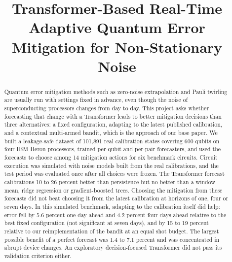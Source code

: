 \documentclass[conference]{IEEEtran}
\begin{document}
\title{Transformer-Based Real-Time Adaptive Quantum Error Mitigation for Non-Stationary Noise}

\author{
\and
{}
\and
{}
}

\maketitle

\begin{abstract}
Quantum error mitigation methods such as zero-noise extrapolation and Pauli twirling are usually run with settings fixed in advance, even though the noise of superconducting processors changes from day to day. This project asks whether forecasting that change with a Transformer leads to better mitigation decisions than three alternatives: a fixed configuration, adapting to the latest published calibration, and a contextual multi-armed bandit, which is the approach of our base paper. We built a leakage-safe dataset of 101,891 real calibration states covering 600 qubits on four IBM Heron processors, trained per-qubit and per-pair forecasters, and used the forecasts to choose among 14 mitigation actions for six benchmark circuits. Circuit execution was simulated with noise models built from the real calibrations, and the test period was evaluated once after all choices were frozen. The Transformer forecast calibrations 10 to 26 percent better than persistence but no better than a window mean, ridge regression or gradient-boosted trees. Choosing the mitigation from these forecasts did not beat choosing it from the latest calibration at horizons of one, four or seven days. In this simulated benchmark, adapting to the calibration itself did help: error fell by 5.6 percent one day ahead and 4.2 percent four days ahead relative to the best fixed configuration (not significant at seven days), and by 15 to 19 percent relative to our reimplementation of the bandit at an equal shot budget. The largest possible benefit of a perfect forecast was 1.4 to 7.1 percent and was concentrated in abrupt device changes. An exploratory decision-focused Transformer did not pass its validation criterion either.
\end{abstract}
\end{document}
